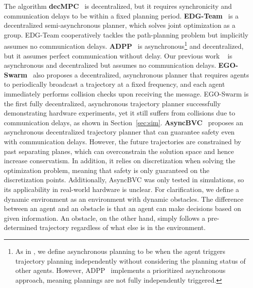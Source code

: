 The algorithm \textbf{decMPC}~\cite{toumieh_decentralized_2022} is decentralized, but it requires synchronicity and communication delays to be within a fixed planning period.
\textbf{EDG-Team}~\cite{hou_enhanced_2022} is a decentralized semi-asynchronous planner, which solves joint optimization as a group. 
EDG-Team cooperatively tackles the path-planning problem but implicitly assumes no communication delays. 
\textbf{ADPP}~\cite{cap_asynchronous_2013} is asynchronous\footnote{As in \cite{tordesillas_mader_2022}, we define asynchronous planning to be when the agent triggers trajectory planning independently without considering the planning status of other agents. 
However, ADPP~\cite{cap_asynchronous_2013} implements a prioritized asynchronous approach, meaning plannings are not fully independently triggered.} and decentralized, but it assumes perfect communication without delay. 
Our previous work \MADER{}~\cite{tordesillas_mader_2022} is asynchronous and decentralized but assumes no communication delays.
\textbf{EGO-Swarm}~\cite{zhou_ego-swarm_2020} also proposes a decentralized, asynchronous planner that requires agents to periodically broadcast a trajectory at a fixed frequency, and each agent immediately performs collision checks upon receiving the message. EGO-Swarm is the first fully decentralized, asynchronous trajectory planner successfully demonstrating hardware experiments, yet it still suffers from collisions due to communication delays, as shown in Section~\ref{sec:sim}. 
\textbf{AsyncBVC}~\cite{senbaslar_asynchronous_2022} proposes an asynchronous decentralized trajectory planner that can guarantee safety even with communication delays.
However, the future trajectories are constrained by past separating planes, which can overconstrain the solution space and hence increase conservatism.
In addition, it relies on discretization when solving the optimization problem, meaning that safety is only guaranteed on the discretization points. Additionally, AsyncBVC was only tested in simulations, so its applicability in real-world hardware is unclear. 
For clarification, we define a dynamic environment as an environment with dynamic obstacles. The difference between an agent and an obstacle is that an agent can make decisions based on given information. An obstacle, on the other hand, simply follows a pre-determined trajectory regardless of what else is in the environment.

